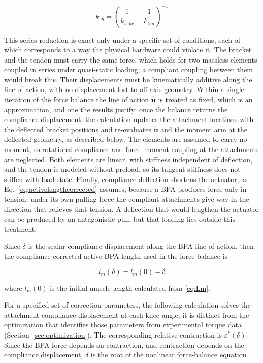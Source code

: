 \begin{equation} k_{eq} = \left( \frac{1}{k_{\hat{u},br}} + \frac{1}{k_{ten}} \right)^{-1}
\label{eq:equivalentstiffness}
\end{equation}

This series reduction is exact only under a specific set of conditions, each of which corresponds to a way the physical hardware could violate it. The bracket and the tendon must carry the same force, which holds for two massless elements coupled in series under quasi-static loading; a compliant coupling between them would break this. Their displacements must be kinematically additive along the line of action, with no displacement lost to off-axis geometry. Within a single iteration of the force balance the line of action $\hat{\mathbf{u}}$ is treated as fixed, which is an approximation, and one the results justify: once the balance returns the compliance displacement, the calculation updates the attachment locations with the deflected bracket positions and re-evaluates $\hat{\mathbf{u}}$ and the moment arm at the deflected geometry, as described below. The elements are assumed to carry no moment, so rotational compliance and force--moment coupling at the attachments are neglected. Both elements are linear, with stiffness independent of deflection, and the tendon is modeled without preload, so its tangent stiffness does not stiffen with load state. Finally, compliance deflection shortens the actuator, as Eq.~\eqref{eq:activelengthcorrected} assumes, because a BPA produces force only in tension: under its own pulling force the compliant attachments give way in the direction that relieves that tension. A deflection that would lengthen the actuator can be produced by an antagonistic pull, but that loading lies outside this treatment.

Since $\delta$ is the scalar compliance displacement along the BPA line of action, then the compliance-corrected active BPA length used in the force balance is

\begin{equation} l_m(\delta) = l_m{(0)} - \delta
\label{eq:activelengthcorrected}
\end{equation}

where $l_m{(0)}$ is the initial muscle length calculated from \eqref{eq:Lm}.

For a specified set of correction parameters, the following calculation solves the attachment-compliance displacement at each knee angle; it is distinct from the optimization that identifies those parameters from experimental torque data (Section~\ref{sec:optimization}). The corresponding relative contraction is $\varepsilon^*(\delta)$. Since the BPA force depends on contraction, and contraction depends on the compliance displacement, $\delta$ is the root of the nonlinear force-balance equation

